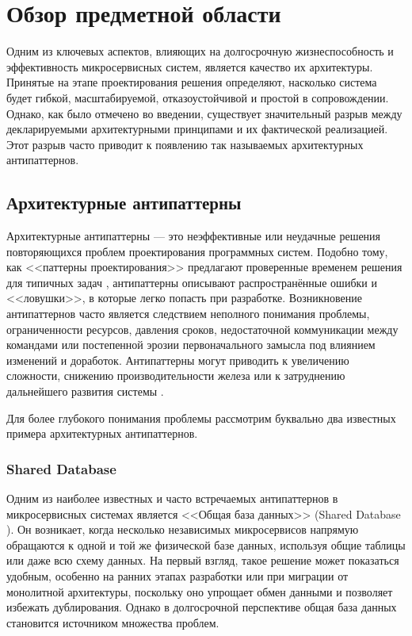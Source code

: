 \section{Обзор предметной области}

Одним из ключевых аспектов, влияющих на долгосрочную жизнеспособность и эффективность микросервисных систем, является качество их архитектуры. Принятые на этапе проектирования решения определяют, насколько система будет гибкой, масштабируемой, отказоустойчивой и простой в сопровождении. Однако, как было отмечено во введении, существует значительный разрыв между декларируемыми архитектурными принципами и их фактической реализацией. Этот разрыв часто приводит к появлению так называемых архитектурных антипаттернов.

\subsection{Архитектурные антипаттерны}

Архитектурные антипаттерны — это неэффективные или неудачные решения повторяющихся проблем проектирования программных систем. Подобно тому, как <<паттерны проектирования>> предлагают проверенные временем решения для типичных задач \cite{microservices-patterns}, антипаттерны описывают распространённые ошибки и <<ловушки>>, в которые легко попасть при разработке. Возникновение антипаттернов часто является следствием неполного понимания проблемы, ограниченности ресурсов, давления сроков, недостаточной коммуникации между командами или постепенной эрозии первоначального замысла под влиянием изменений и доработок. Антипаттерны могут приводить к увеличению сложности, снижению производительности железа или к затруднению дальнейшего развития системы \cite{antipattern-def}.

Для более глубокого понимания проблемы рассмотрим буквально два известных примера архитектурных антипаттернов.

\subsubsection{Shared Database}

Одним из наиболее известных и часто встречаемых антипаттернов в микросервисных системах является <<Общая база данных>> (Shared Database \cite{shared-db-ap}). Он возникает, когда несколько независимых микросервисов напрямую обращаются к одной и той же физической базе данных, используя общие таблицы или даже всю схему данных. На первый взгляд, такое решение может показаться удобным, особенно на ранних этапах разработки или при миграции от монолитной архитектуры, поскольку оно упрощает обмен данными и позволяет избежать дублирования. Однако в долгосрочной перспективе общая база данных становится источником множества проблем.

